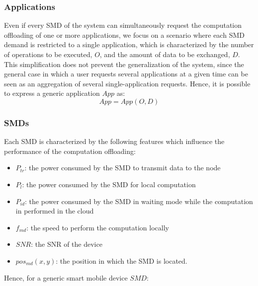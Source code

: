 \documentclass[twoside,openright]{report}
\begin{document}
\subsubsection{Applications}
Even if every \gls{SMD} of the system can simultaneously request the computation offloading of one or more applications, we focus on a scenario where each \gls{SMD} demand is restricted to a single application, which is characterized by the number of operations to be executed, $O$, and the amount of data to be exchanged, $D$. 
This simplification does not prevent the generalization of the system, since the general case in which a user requests several applications at a given time can be seen as an aggregation of several single-application requests.   
Hence, it is possible to express a generic application $\textit{App}$ as:
\begin{equation}
\label{App-5}
\textit{App} = \textit{App}(O,D)
\end{equation} 
\subsubsection{SMDs}
Each \gls{SMD} is characterized by the following features which influence the performance of the computation offloading:
\begin{itemize}
\item{$P_\textit{tr}$: the power consumed by the \gls{SMD} to transmit data to the node}
\item{$P_l$: the power consumed by the \gls{SMD} for local computation}
\item{$P_\textit{id}$: the power consumed by the \gls{SMD} in waiting mode while the computation in performed in the cloud}
\item{$f_\textit{md}$: the speed to perform the computation locally}
\item{$\textit{SNR}$: the \gls{SNR} of the device}
\item{$pos_\textit{md}(x,y)$: the position in which the \gls{SMD} is located.}
\end{itemize}
Hence, for a generic smart mobile device $\textit{SMD}$:
\end{document}
